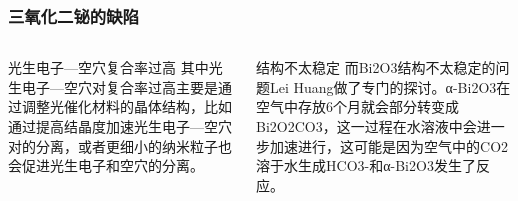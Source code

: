 \documentclass[xetex,compress]{mybeamer}
\begin{document}
\begin{frame}
\frametitle{三氧化二铋的缺陷}
\begin{columns}
\begin{block}{光生电子—空穴复合率过高}
其中光生电子—空穴对复合率过高主要是通过调整光催化材料的晶体结构，比如通过提高结晶度加速光生电子—空穴对的分离，或者更细小的纳米粒子也会促进光生电子和空穴的分离。
\end{block}
\begin{block}{结构不太稳定}
而Bi2O3结构不太稳定的问题Lei Huang做了专门的探讨。α-Bi2O3在空气中存放6个月就会部分转变成Bi2O2CO3，这一过程在水溶液中会进一步加速进行，这可能是因为空气中的CO2溶于水生成HCO3-和α-Bi2O3发生了反应。
\end{block}
\end{columns}
\end{frame}

\end{document}
